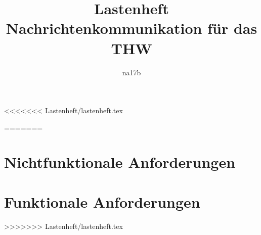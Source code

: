 \documentclass[a4paper,11pt,oneside, titlepage]{article}
\title{Lastenheft\\Nachrichtenkommunikation für das THW}
\author{na17b}
\date{}
\begin{document}
\maketitle
\tableofcontents
\newpage

<<<<<<< Lastenheft/lastenheft.tex




=======


\section{Nichtfunktionale Anforderungen}


\section{Funktionale Anforderungen}



%
%
>>>>>>> Lastenheft/lastenheft.tex
\end{document}
